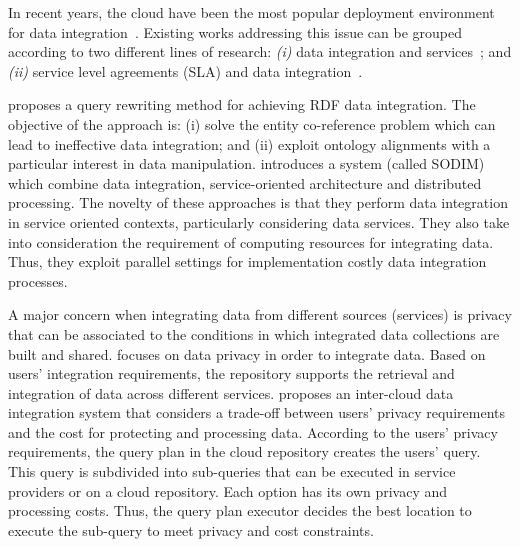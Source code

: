 In recent years, the cloud have been the most popular deployment environment for data integration~\cite{Carvalho2015}. Existing works addressing this issue can be grouped according to two different lines of research:
\textit{(i)} data integration and services~\cite{Correndo2010,ElSheikh2013,Tian2010,YauY08}; and
\textit{(ii)} service level agreements (SLA) and data integration~\cite{Bennani2014,Nie07}. 

\cite{Correndo2010} proposes a query rewriting method for achieving RDF data
integration. %
The objective of the approach is: (i) solve the entity co-reference problem which can lead to ineffective data integration; and (ii) exploit ontology alignments with a particular interest in data manipulation. 
\cite{ElSheikh2013} introduces a system (called SODIM) which combine data
integration, service-oriented architecture and distributed processing. %
The novelty of these approaches is that they perform data integration in service oriented contexts, particularly considering data services. They also take into consideration the requirement of computing resources for integrating data. Thus, they exploit parallel settings for implementation costly data integration processes. 

A major concern when integrating data from different sources (services) is privacy that can be associated to the conditions in which integrated data collections are built and shared.
\cite{YauY08} focuses on data privacy in order to integrate data.
Based on users' integration requirements, the repository supports the retrieval and integration of
data across different services. 
\cite{Tian2010} proposes an inter-cloud data integration system that considers a trade-off between users' privacy requirements and the cost for protecting and processing data. According to the users' privacy requirements, the query plan in the cloud repository creates the users' query. This query is subdivided into sub-queries that can
be executed in service providers or on a cloud repository. Each option has its own  privacy and processing costs.
Thus, the query plan executor decides the best location to execute the sub-query to meet privacy and cost constraints.

